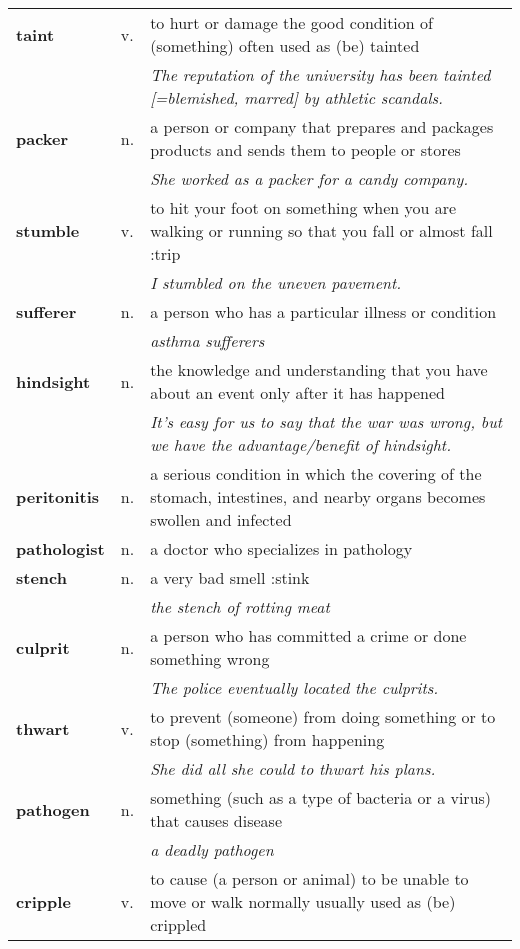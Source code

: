 \documentclass[a4paper]{article}
\begin{document}
\begin{longtable}{llp{11cm}}
\textbf{taint} & v. &  to hurt or damage the good condition of (something) often used as (be) tainted \\
 & & \textit{The reputation of the university has been tainted [=blemished, marred] by athletic scandals.}\\[0.08cm]
\textbf{packer} & n. &  a person or company that prepares and packages products and sends them to people or stores \\
 & & \textit{She worked as a packer for a candy company.}\\[0.08cm]
\textbf{stumble} & v. &  to hit your foot on something when you are walking or running so that you fall or almost fall :trip \\
 & & \textit{I stumbled on the uneven pavement.}\\[0.08cm]
\textbf{sufferer} & n. &  a person who has a particular illness or condition \\
 & & \textit{asthma sufferers}\\[0.08cm]
\textbf{hindsight} & n. &  the knowledge and understanding that you have about an event only after it has happened \\
 & & \textit{It's easy for us to say that the war was wrong, but we have the advantage/benefit of hindsight.}\\[0.08cm]
\textbf{peritonitis} & n. &  a serious condition in which the covering of the stomach, intestines, and nearby organs becomes swollen and infected\\[0.08cm]
\textbf{pathologist} & n. &  a doctor who specializes in pathology\\[0.08cm]
\textbf{stench} & n. &  a very bad smell :stink \\
 & & \textit{the stench of rotting meat}\\[0.08cm]
\textbf{culprit} & n. &  a person who has committed a crime or done something wrong \\
 & & \textit{The police eventually located the culprits.}\\[0.08cm]
\textbf{thwart} & v. &  to prevent (someone) from doing something or to stop (something) from happening \\
 & & \textit{She did all she could to thwart his plans.}\\[0.08cm]
\textbf{pathogen} & n. &  something (such as a type of bacteria or a virus) that causes disease \\
 & & \textit{a deadly pathogen}\\[0.08cm]
\textbf{cripple} & v. &  to cause (a person or animal) to be unable to move or walk normally usually used as (be) crippled \\

\end{longtable}
\end{document}
